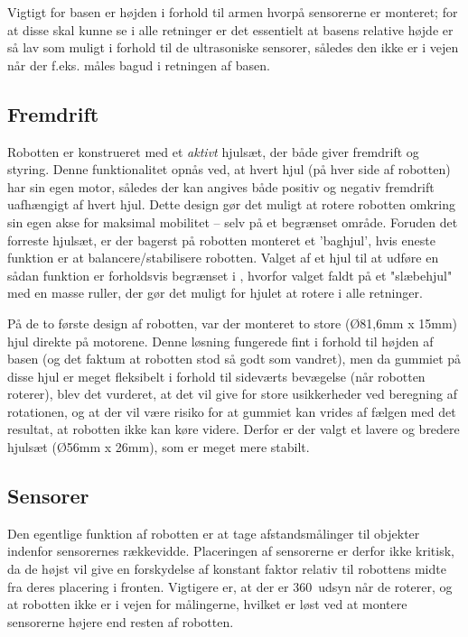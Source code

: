 Vigtigt for basen er højden i forhold til armen hvorpå sensorerne er monteret; for at disse skal kunne se i alle retninger er det essentielt at basens relative højde er så lav som muligt i forhold til de ultrasoniske sensorer, således den ikke er i vejen når der f.eks. måles bagud i retningen af basen. 

\subsection{Fremdrift}
Robotten er konstrueret med et \textit{aktivt} hjulsæt, der både giver fremdrift og styring.
Denne funktionalitet opnås ved, at hvert hjul (på hver side af robotten) har sin egen motor, således der kan angives både positiv og negativ fremdrift uafhængigt af hvert hjul.
Dette design gør det muligt at rotere robotten omkring sin egen akse for maksimal mobilitet -- selv på et begrænset område.
Foruden det forreste hjulsæt, er der bagerst på robotten monteret et 'baghjul', hvis eneste funktion er at balancere/stabilisere robotten.
Valget af et hjul til at udføre en sådan funktion er forholdsvis begrænset i \lego, hvorfor valget faldt på et "slæbehjul" med en masse ruller, der gør det muligt for hjulet at rotere i alle retninger.

På de to første design af robotten, var der monteret to store (Ø81,6mm x 15mm) hjul direkte på motorene.
Denne løsning fungerede fint i forhold til højden af basen (og det faktum at robotten stod så godt som vandret), men da gummiet på disse hjul er meget fleksibelt i forhold til sideværts bevægelse (når robotten roterer), blev det vurderet, at det vil give for store usikkerheder ved beregning af rotationen, og at der vil være risiko for at gummiet kan vrides af fælgen med det resultat, at robotten ikke kan køre videre.
Derfor er der valgt et lavere og bredere hjulsæt (Ø56mm x 26mm), som er meget mere stabilt.

\subsection{Sensorer}
Den egentlige funktion af robotten er at tage afstandsmålinger til objekter indenfor sensorernes rækkevidde.
Placeringen af sensorerne er derfor ikke kritisk, da de højst vil give en forskydelse af konstant faktor relativ til robottens midte fra deres placering i fronten.
Vigtigere er, at der er 360\degree~udsyn når de roterer, og at robotten ikke er i vejen for målingerne, hvilket er løst ved at montere sensorerne højere end resten af robotten.

